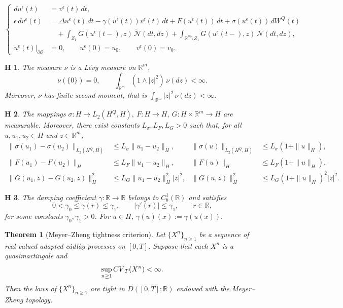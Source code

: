 \documentclass[10pt,a4paper]{amsart}
\theoremstyle{plain}
\newtheorem{theorem}{Theorem}[section]
\newtheorem{Assumption}{H\!\!} %
\numberwithin{equation}{section}
\begin{document}
\setcounter{section}{1}
\begin{equation}\label{e:SLE-11}
\left\{
\begin{aligned}
du^\epsilon(t) &=v^\epsilon(t)\,dt,\\
\epsilon\,dv^\epsilon(t) &=\Delta u^\epsilon(t)\,dt-\gamma(u^\epsilon(t))v^\epsilon(t)\,dt+F(u^\epsilon(t))\,dt+\sigma(u^\epsilon(t))\,dW^Q(t)\\
&\quad +\int_{Z_1}G(u^\epsilon(t-),z)\,\tilde{\mathcal N}(dt,dz) +\int_{\mathbb R^m\setminus Z_1} G(u^\epsilon(t-),z)\,\mathcal N(dt,dz),\\
u^\epsilon(t)|_{\partial\mathcal O}&=0,\qquad u^\epsilon(0)=u_0,\qquad v^\epsilon(0)=v_0 ,
\end{aligned}
\right.
\end{equation}

\begin{Assumption}\label{H1}
The measure \(\nu\) is a L\'evy measure on \(\mathbb R^m\), 
\[
\nu(\{0\})=0, \qquad \int_{\mathbb R^m}(1\wedge |z|^2)\,\nu(dz)<\infty .
\]
Moreover, \(\nu\) has finite second moment, that is \(\int_{\mathbb R^m}|z|^2\,\nu(dz)<\infty .\)
\end{Assumption}

\begin{Assumption}\label{H2}
The mappings \(\sigma:H\to L_2(H^Q,H),~F:H\to H,~G:H\times\mathbb R^m\to H\)
are measurable. Moreover, there exist constants \(L_\sigma,L_F,L_G>0\) such that, for all
\(u,u_1,u_2\in H\) and \(z\in\mathbb R^m\),
\begin{align*}
\|\sigma(u_1)-\sigma(u_2)\|_{L_2(H^Q,H)}&\le L_\sigma\|u_1-u_2\|_H,&\|\sigma(u)\|_{L_2(H^Q,H)}&\le L_\sigma(1+\|u\|_H),\\
\|F(u_1)-F(u_2)\|_H&\le L_F\|u_1-u_2\|_H,&\|F(u)\|_H&\le L_F(1+\|u\|_H),\\
\|G(u_1,z)-G(u_2,z)\|_H^2&\le L_G\|u_1-u_2\|_H^2|z|^2,&\|G(u,z)\|_H^2&\le L_G(1+\|u\|_H)^2|z|^2 .
\end{align*}
\end{Assumption}

\begin{Assumption}\label{H3}
The damping coefficient \(\gamma:\mathbb R\to\mathbb R\) belongs to
\(C_b^1(\mathbb R)\) and satisfies
\[
0<\gamma_0\le \gamma(r)\le \gamma_1,\qquad|\gamma'(r)|\le \gamma_1,\qquad r\in\mathbb R,
\]
for some constants \(\gamma_0,\gamma_1>0\). For \(u\in H\),   \(\gamma(u)(x):=\gamma(u(x)).\)
\end{Assumption}

\begin{theorem}[Meyer--Zheng tightness criterion]\label{thm:MZ-tightness}
Let \(\{X^n\}_{n\ge1}\) be a sequence of real-valued adapted c\`adl\`ag
processes on \([0,T]\). Suppose that each \(X^n\) is a quasimartingale and
\[
\sup_{n\ge1}{\rm CV}_T(X^n)<\infty.
\]
Then the laws of \(\{X^n\}_{n\ge1}\) are tight in
\(D([0,T];\mathbb R)\) endowed with the Meyer--Zheng topology.
\end{theorem}
\end{document}
